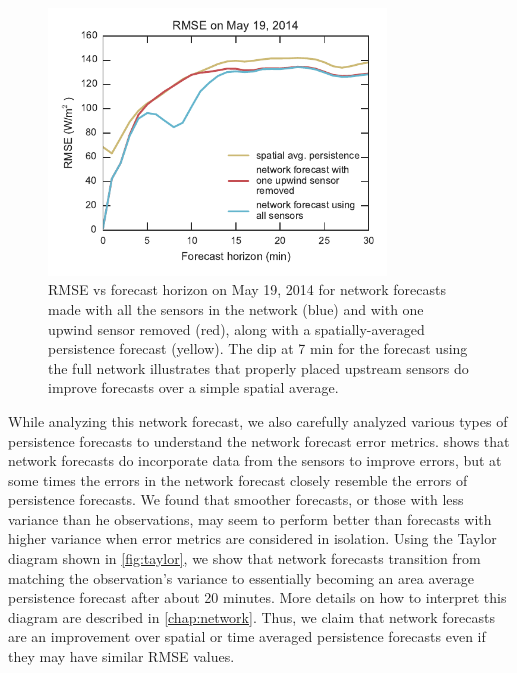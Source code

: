 \begin{figure}[htbp]
 \centering
 \includegraphics[width=0.8\textwidth]{figs/missing.pdf}
 \caption[Example of a sensor's influence on network forecasts]{RMSE
   vs forecast horizon on May 19, 2014 for network forecasts made with
   all the sensors in the network (blue) and with one upwind sensor
   removed (red), along with a spatially-averaged persistence forecast
   (yellow). The dip at 7 min for the forecast using the full network
   illustrates that properly placed upstream sensors do improve
   forecasts over a simple spatial average.
}
\label{fig:circuitbreak}
\end{figure}

While analyzing this network forecast, we also carefully analyzed
various types of persistence forecasts to understand the network
forecast error metrics.
 shows that network forecasts do incorporate
data from the sensors to improve errors, but at some times the errors
in the network forecast closely resemble the errors of persistence forecasts.
We found that smoother forecasts, or those with less variance than he
observations, may seem to perform better than forecasts with higher
variance when error metrics are considered in isolation.
Using the Taylor diagram shown in \cref{fig:taylor}, we show that
network forecasts transition from matching the observation's variance
to essentially becoming an area average persistence forecast after
about 20 minutes.
More details on how to interpret this diagram are described in
\cref{chap:network}.
Thus, we claim that network forecasts are an improvement over spatial
or time averaged persistence forecasts even if they may have similar
RMSE values.

